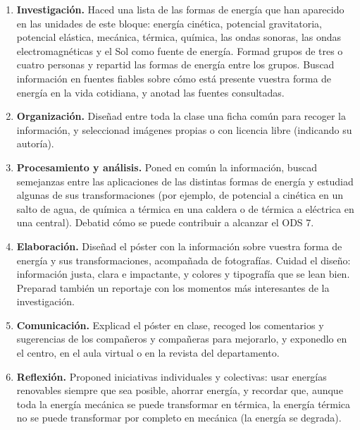 \begin{enumerate}[label=\numberballred]
    \item \textbf{Investigación.} Haced una lista de las formas de energía que han aparecido en las unidades de este bloque: energía cinética, potencial gravitatoria, potencial elástica, mecánica, térmica, química, las ondas sonoras, las ondas electromagnéticas y el Sol como fuente de energía. Formad grupos de tres o cuatro personas y repartid las formas de energía entre los grupos. Buscad información en fuentes fiables sobre cómo está presente vuestra forma de energía en la vida cotidiana, y anotad las fuentes consultadas.
    \item \textbf{Organización.} Diseñad entre toda la clase una ficha común para recoger la información, y seleccionad imágenes propias o con licencia libre (indicando su autoría).
    \item \textbf{Procesamiento y análisis.} Poned en común la información, buscad semejanzas entre las aplicaciones de las distintas formas de energía y estudiad algunas de sus transformaciones (por ejemplo, de potencial a cinética en un salto de agua, de química a térmica en una caldera o de térmica a eléctrica en una central). Debatid cómo se puede contribuir a alcanzar el ODS 7.
    \item \textbf{Elaboración.} Diseñad el póster con la información sobre vuestra forma de energía y sus transformaciones, acompañada de fotografías. Cuidad el diseño: información justa, clara e impactante, y colores y tipografía que se lean bien. Preparad también un reportaje con los momentos más interesantes de la investigación.
    \item \textbf{Comunicación.} Explicad el póster en clase, recoged los comentarios y sugerencias de los compañeros y compañeras para mejorarlo, y exponedlo en el centro, en el aula virtual o en la revista del departamento.
    \item \textbf{Reflexión.} Proponed iniciativas individuales y colectivas: usar energías renovables siempre que sea posible, ahorrar energía, y recordar que, aunque toda la energía mecánica se puede transformar en térmica, la energía térmica no se puede transformar por completo en mecánica (la energía se degrada).
\end{enumerate}
